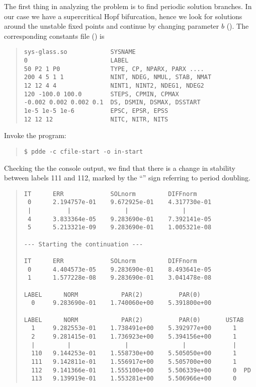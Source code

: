 \documentclass[10pt,a4paper]{ddedoc}
\begin{document}
The first thing in analyzing the problem is to find periodic solution
branches. In our case we have a supercritical Hopf bifurcation, hence we look
for solutions around the unstable fixed points and continue by changing
parameter $b$ (). The corresponding constants file () is
{ \small \begin{quote} \begin{lstlisting}[basicstyle=\tt,frame=single]
sys-glass.so            SYSNAME
0                       LABEL
50 P2 1 P0              TYPE, CP, NPARX, PARX ....
200 4 5 1 1             NINT, NDEG, NMUL, STAB, NMAT
12 12 4 4               NINT1, NINT2, NDEG1, NDEG2
120 -100.0 100.0        STEPS, CPMIN, CPMAX
-0.002 0.002 0.002 0.1  DS, DSMIN, DSMAX, DSSTART
1e-5 1e-5 1e-6          EPSC, EPSR, EPSS
12 12 12                NITC, NITR, NITS
\end{lstlisting} \end{quote} } \noindent
Invoke the program:
{ \small \begin{quote} \begin{lstlisting}[basicstyle=\tt,frame=single]
$ pdde -c cfile-start -o in-start
\end{lstlisting} \end{quote} } \noindent
Checking the the console output, we find that there is a change in
stability between labels 111 and 112, marked by the ``'' sign referring to period doubling.
{ \small \begin{quote} \begin{lstlisting}[basicstyle=\tt,frame=single]
IT      ERR             SOLnorm         DIFFnorm
 0      2.194757e-01    9.672925e-01    4.317730e-01
 |          |               |               |
 4      3.833364e-05    9.283690e-01    7.392141e-05
 5      5.213321e-09    9.283690e-01    1.005321e-08

--- Starting the continuation ---

IT      ERR             SOLnorm         DIFFnorm
 0      4.404573e-05    9.283690e-01    8.493641e-05
 1      1.577228e-08    9.283690e-01    3.041478e-08

LABEL      NORM            PAR(2)          PAR(0)
  0     9.283690e-01    1.740060e+00    5.391800e+00

LABEL      NORM            PAR(2)          PAR(0)       USTAB
  1     9.282553e-01    1.738491e+00    5.392977e+00      1
  2     9.281415e-01    1.736923e+00    5.394156e+00      1
  |         |               |               |             |
  110   9.144253e-01    1.558730e+00    5.505050e+00      1
  111   9.142811e-01    1.556917e+00    5.505700e+00      1
  112   9.141366e-01    1.555100e+00    5.506339e+00      0  PD
  113   9.139919e-01    1.553281e+00    5.506966e+00      0
\end{lstlisting} \end{quote} } \noindent
\end{document}
